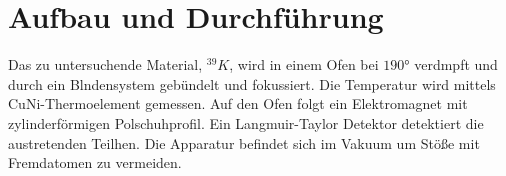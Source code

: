 \section{Aufbau und Durchführung}
\label{sec:Durchführung}
Das zu untersuchende Material, $^39K$, wird in einem Ofen bei $190\si{\degree}$
verdmpft und durch ein Blndensystem gebündelt und fokussiert.
Die Temperatur wird mittels CuNi-Thermoelement gemessen.
Auf den Ofen folgt ein Elektromagnet mit zylinderförmigen Polschuhprofil.
Ein Langmuir-Taylor Detektor detektiert die austretenden Teilhen.
Die Apparatur befindet sich im Vakuum um Stöße mit Fremdatomen zu vermeiden.
